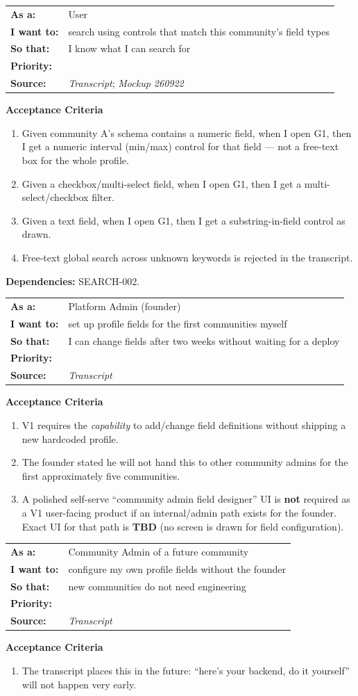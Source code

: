 \documentclass[11pt,a4paper]{article}
\makeatletter
\newcommand{\priPzero}{\colorbox{p0}{\makebox[4.6em]{\textcolor{white}{\scriptsize\bfseries P0 V1}}}}
\newcommand{\priPtwo}{\colorbox{p2}{\makebox[4.6em]{\textcolor{white}{\scriptsize\bfseries P2 Later}}}}
\newcommand{\srcTx}{\textit{Transcript}}
\newcommand{\srcMock}{\textit{Mockup 260922}}
\newenvironment{story}[1]{%
  \Needspace{10\baselineskip}%
  \vspace{0.7em}%
  \noindent
  \colorbox{navy}{\makebox[\dimexpr\textwidth-2\fboxsep\relax][l]{\textcolor{white}{\bfseries\ #1}}}%
  \par\vspace{0.35em}%
}{\par\vspace{0.55em}}
\newcommand{\storymeta}[5]{%
  \noindent
  \begin{tabularx}{\textwidth}{@{}>{\bfseries}l X@{}}
    As a: & #1 \\
    I want to: & #2 \\
    So that: & #3 \\
    Priority: & #4 \\
    Source: & #5 \\
  \end{tabularx}
  \par\vspace{0.3em}
}
\newcommand{\achead}{\noindent\textbf{Acceptance Criteria}\par}
\newcommand{\deps}[1]{\noindent\textbf{Dependencies:} #1\par}
\makeatother
\begin{document}
\begin{story}{DYN-003 --- Search form is generated from the same schema}
\storymeta{User}{search using controls that match this community's field types}{I know what I can search for}{\priPzero}{\srcTx; \srcMock}
\achead
\begin{enumerate}
  \item Given community A's schema contains a numeric field, when I open G1, then I get a numeric interval (min/max) control for that field --- not a free-text box for the whole profile.
  \item Given a checkbox/multi-select field, when I open G1, then I get a multi-select/checkbox filter.
  \item Given a text field, when I open G1, then I get a substring-in-field control as drawn.
  \item Free-text global search across unknown keywords is rejected in the transcript.
\end{enumerate}
\deps{SEARCH-002.}
\end{story}

\begin{story}{DYN-004 --- Who configures fields in V1}
\storymeta{Platform Admin (founder)}{set up profile fields for the first communities myself}{I can change fields after two weeks without waiting for a deploy}{\priPzero}{\srcTx}
\achead
\begin{enumerate}
  \item V1 requires the \emph{capability} to add/change field definitions without shipping a new hardcoded profile.
  \item The founder stated he will not hand this to other community admins for the first approximately five communities.
  \item A polished self-serve ``community admin field designer'' UI is \textbf{not} required as a V1 user-facing product if an internal/admin path exists for the founder. Exact UI for that path is \textbf{TBD} (no screen is drawn for field configuration).
\end{enumerate}
\end{story}

\begin{story}{DYN-005 --- Self-serve field configuration for other community admins}
\storymeta{Community Admin of a future community}{configure my own profile fields without the founder}{new communities do not need engineering}{\priPtwo}{\srcTx}
\achead
\begin{enumerate}
  \item The transcript places this in the future: ``here's your backend, do it yourself'' will not happen very early.
\end{enumerate}
\end{story}
\end{document}
